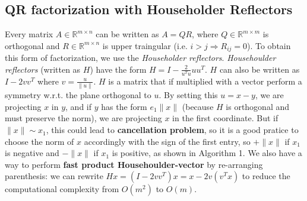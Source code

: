 \documentclass{article}
\begin{document}
\subsection{QR factorization with Householder Reflectors}
Every matrix $A \in \mathds{R}^{m \times n}$ can be written as $A = QR$, where $Q \in \mathds{R}^{m \times m}$ is orthogonal and $R \in \mathds{R}^{m \times n}$ is upper traingular (i.e. $i > j \Rightarrow R_{ij} = 0$).
To obtain this form of factorization, we use the \textit{Householder reflectors}.
\textit{Househoulder reflectors} (written as $H$) have the form $H = I - \frac{2}{u^{T}u}uu^{T}$.
$H$ can also be written as $I - 2vv^{T}$ where $v = \frac{u}{\|u\|}$.
$H$ is a matrix that if multiplied with a vector perform a symmetry w.r.t. the plane orthogonal to $u$.
By setting this $u=x-y$, we are projecting $x$ in $y$, and if $y$ has the form $e_{1}\|x\|$ (because $H$ is orthogonal and must preserve the norm), we are projecting $x$ in the first coordinate.
But if $\|x\| \sim x_{1}$, this could lead to \textbf{cancellation problem}, so it is a good pratice to choose the norm of $x$ accordingly with the sign of the first entry, so $+\|x\|$ if $x_{1}$ is negative and $-\|x\|$ if $x_{1}$ is positive, as shown in Algorithm 1.
We also have a way to perform \textbf{fast product Househoulder-vector} by re-arranging parenthesis: we can rewrite $Hx = (I - 2vv^{T})x = x - 2v(v^{T}x)$ to reduce the computational complexity from $O(m^2)$ to $O(m)$.
\end{document}

